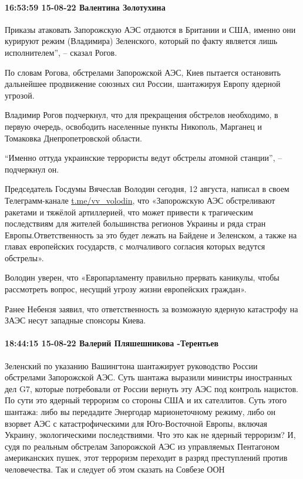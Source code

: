 \paragraph{16:53:59 15-08-22 Валентина Золотухина}

Приказы атаковать Запорожскую АЭС отдаются в Британии и США, именно они
курируют режим (Владимира) Зеленского, который по факту является лишь
исполнителем”, – сказал Рогов.

По словам Рогова, обстрелами Запорожской АЭС, Киев пытается остановить
дальнейшее продвижение союзных сил России, шантажируя Европу ядерной угрозой.

Владимир Рогов подчеркнул, что для прекращения обстрелов необходимо, в первую
очередь, освободить населенные пункты Никополь, Марганец и Томаковка
Днепропетровской области.

\enquote{Именно оттуда украинские террористы ведут обстрелы атомной станции}, –
подчеркнул он.

Председатель Госдумы Вячеслав Володин сегодня, 12 августа, написал в своем
Телеграмм-канале \url{t.me/vv_volodin}, что «Запорожскую АЭС обстреливают ракетами и
тяжёлой артиллерией, что может привести к трагическим последствиям для жителей
большинства регионов Украины и ряда стран Европы.Ответственность за это будет
лежать на Байдене и Зеленском, а также на главах европейских государств, с
молчаливого согласия которых ведутся обстрелы».

Володин уверен, что «Европарламенту правильно прервать каникулы, чтобы
рассмотреть вопрос, несущий угрозу жизни европейских граждан».

Ранее Небензя заявил, что ответственность за возможную ядерную катастрофу на
ЗАЭС несут западные спонсоры Киева.

\paragraph{18:44:15 15-08-22 Валерий Пляшешникова -Терентьев}

Зеленский по указанию Вашингтона шантажирует руководство России обстрелами
Запорожской АЭС. Суть шантажа выразили министры иностранных дел G7, которые
потребовали от России вернуть эту АЭС под контроль нацистов. По сути это
ядерный терроризм со стороны США и их сателлитов. Суть этого шантажа: либо вы
передадите Энергодар марионеточному режиму, либо он взорвет АЭС с
катастрофическими для Юго-Восточной Европы, включая Украину, экологическими
последствиями. Что это как не ядерный терроризм? И, судя по реальным обстрелам
Запорожской АЭС из управляемых Пентагоном американских пушек, этот терроризм
переходит в разряд преступлений против человечества. Так и следует об этом
сказать на Совбезе ООН

